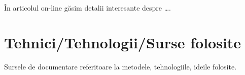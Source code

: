 
În articolul on-line \cite{electronic-citation} găsim detalii interesante despre \dots.


\section{Tehnici/Tehnologii/Surse folosite}

Sursele de documentare referitoare la metodele, tehnologiile, ideile folosite. 




